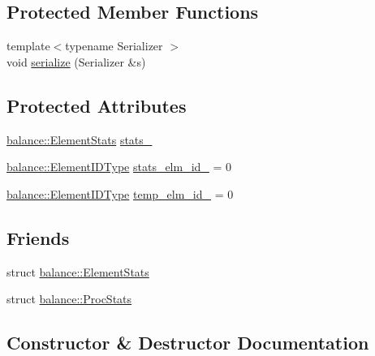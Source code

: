 \subsection*{Protected Member Functions}
\begin{DoxyCompactItemize}
\item 
{\footnotesize template$<$typename Serializer $>$ }\\void \hyperlink{structvt_1_1vrt_1_1collection_1_1_migratable_a68907336079892caf5af1fd4b38c102a}{serialize} (Serializer \&s)
\end{DoxyCompactItemize}
\subsection*{Protected Attributes}
\begin{DoxyCompactItemize}
\item 
\hyperlink{structvt_1_1vrt_1_1collection_1_1balance_1_1_element_stats}{balance\+::\+Element\+Stats} \hyperlink{structvt_1_1vrt_1_1collection_1_1_migratable_a311e171ef2dafb9d26975f3677e4fdaa}{stats\+\_\+}
\item 
\hyperlink{namespacevt_1_1vrt_1_1collection_1_1balance_a14c8d2c972f2913aa3f1636e5be0a120}{balance\+::\+Element\+I\+D\+Type} \hyperlink{structvt_1_1vrt_1_1collection_1_1_migratable_a905932dd92539fb68fa811c8a21e8e30}{stats\+\_\+elm\+\_\+id\+\_\+} = 0
\item 
\hyperlink{namespacevt_1_1vrt_1_1collection_1_1balance_a14c8d2c972f2913aa3f1636e5be0a120}{balance\+::\+Element\+I\+D\+Type} \hyperlink{structvt_1_1vrt_1_1collection_1_1_migratable_a0a6e381b0220dbb905a755e8262c8695}{temp\+\_\+elm\+\_\+id\+\_\+} = 0
\end{DoxyCompactItemize}
\subsection*{Friends}
\begin{DoxyCompactItemize}
\item 
struct \hyperlink{structvt_1_1vrt_1_1collection_1_1_migratable_abdce9596911e092af07635bdcc13acd1}{balance\+::\+Element\+Stats}
\item 
struct \hyperlink{structvt_1_1vrt_1_1collection_1_1_migratable_a351f42ef1db264cf1401656f47df21c5}{balance\+::\+Proc\+Stats}
\end{DoxyCompactItemize}


\subsection{Constructor \& Destructor Documentation}
\mbox{\label{structvt_1_1vrt_1_1collection_1_1_migratable_aed21a92808d62ff482cb44d750267b0c}} 
